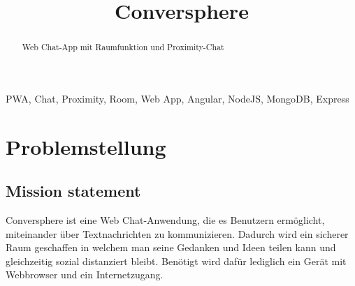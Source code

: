 \documentclass[conference]{IEEEtran}
\begin{document}
	\title{Conversphere}
	\author{
		\and
		\and
		\and
		\and
	}

	\maketitle

	\begin{abstract}
		Web Chat-App mit Raumfunktion und Proximity-Chat
	\end{abstract}

	\begin{IEEEkeywords}
		PWA, Chat, Proximity, Room, Web App, Angular, NodeJS, MongoDB, Express
	\end{IEEEkeywords}

	\section{Problemstellung}
    \subsection{Mission statement}
	Conversphere ist eine Web Chat-Anwendung, die es Benutzern ermöglicht, miteinander über Textnachrichten zu kommunizieren. 
    Dadurch wird ein sicherer Raum geschaffen in welchem man seine Gedanken und Ideen teilen kann und gleichzeitig sozial distanziert bleibt. 
    Benötigt wird dafür lediglich ein Gerät mit Webbrowser und ein Internetzugang.
	\ \\
\end{document}
